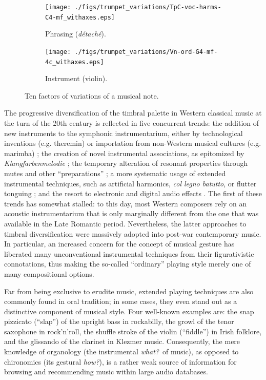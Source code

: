 \documentclass{article}
\makeatletter
\newcommand*{\eg}{e.g.\@\xspace}
\makeatother
\begin{document}
\begin{figure}
        \begin{subfigure}[b]{0.25\textwidth}
                \centering
                \texttt{[image: ./figs/trumpet\_variations/TpC-voc-harms-C4-mf\_withaxes.eps]}
                \caption{Phrasing (\emph{d\'{e}tach\'{e}}).}
                \label{fig:TpC+voc-harms-G4-mf_withaxes}
        \end{subfigure}%
        \begin{subfigure}[b]{0.25\textwidth}
                \centering
                \texttt{[image: ./figs/trumpet\_variations/Vn-ord-G4-mf-4c\_withaxes.eps]}
                \caption{Instrument (violin).}
                \label{fig:Vn-ord-G4-mf-4c}
        \end{subfigure}
        \caption{Ten factors of variations of a musical note.}\label{fig:trumpet-variations}
\end{figure}

The progressive diversification of the timbral palette in Western classical music at the turn of the 20th century is reflected in five concurrent trends:
the addition of new instruments to the symphonic instrumentarium, either by technological inventions (\eg theremin) or importation from non-Western musical cultures (\eg marimba) \cite{sachs2012book};
the creation of novel instrumental associations, as epitomized by \emph{Klangfarbenmelodie} \cite{schoenberg2010book};
the temporary alteration of resonant properties through mutes and other ``preparations'' \cite{dianova2007phd};
a more systematic usage of extended instrumental techniques, such as artificial harmonics, \emph{col legno batutto}, or flutter tonguing \cite{kostka2016book};
and the resort to electronic and digital audio effects \cite{zolzer2011dafx}.
The first of these trends has somewhat stalled: to this day, most Western composers rely on an acoustic instrumentarium that is only marginally different from the one that was available in the Late Romantic period.
Nevertheless, the latter approaches to timbral diversification were massively adopted into post-war contemporary music.
In particular, an increased concern for the concept of musical gesture \cite{godoy2009book} has liberated many unconventional instrumental techniques from their figurativistic connotations, thus making the so-called ``ordinary'' playing style merely one of many compositional options.


Far from being exclusive to erudite music, extended playing techniques are also commonly found in oral tradition; in some cases, they even stand out as a distinctive component of musical style.
Four well-known examples are:
the snap pizzicato (``slap'') of the upright bass in rockabilly,
the growl of the tenor saxophone in rock'n'roll,
the shuffle stroke of the violin (``fiddle'') in Irish folklore,
and the glissando of the clarinet in Klezmer music.
Consequently, the mere knowledge of organology (the instrumental \emph{what?}~of music), as opposed to chironomics (its gestural \emph{how?}), is a rather weak source of information for browsing and recommending music within large audio databases.
\end{document}
